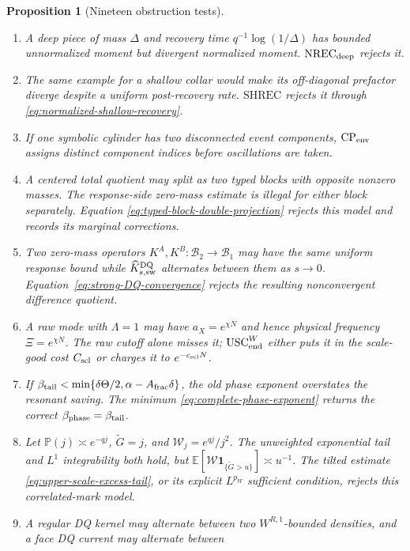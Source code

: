 \documentclass[11pt]{article}
\newtheorem{proposition}[theorem]{Proposition}
\newcommand{\cB}{\mathcal B}
\newcommand{\one}{\mathbf 1}
\begin{document}
\begin{proposition}[Nineteen obstruction tests]
\begin{enumerate}[label=\textup{(T\arabic*)}]
      the latter and never infers it from signed TV.
\item A deep piece of mass $\Delta$ and recovery time
      $q^{-1}\log(1/\Delta)$ has bounded unnormalized moment but divergent
      normalized moment.  $\mathrm{NREC}_{\rm deep}$ rejects it.
\item The same example for a shallow collar would make its off-diagonal
      prefactor diverge despite a uniform post-recovery rate.
      $\mathrm{SHREC}$ rejects it through
      \eqref{eq:normalized-shallow-recovery}.
\item If one symbolic cylinder has two disconnected event components,
      $\mathrm{CP}_{\rm env}$ assigns distinct component indices before
      oscillations are taken.
\item A centered total quotient may split as two typed blocks with opposite
      nonzero masses.  The response-side zero-mass estimate is illegal for
      either block separately.  Equation
      \eqref{eq:typed-block-double-projection} rejects this model and records
      its marginal corrections.
\item Two zero-mass operators $K^A,K^B:\cB_2\to\cB_1$ may have the same
      uniform response bound while
      $\widehat K_{s,\rm sw}^{\rm DQ}$ alternates between them as $s\to0$.
      Equation~\eqref{eq:strong-DQ-convergence} rejects the resulting
      nonconvergent difference quotient.
\item A raw mode with $\Lambda=1$ may have $a_X=e^{\chi N}$ and hence
      physical frequency $\Xi=e^{\chi N}$.  The raw cutoff alone misses it;
      $\mathrm{USC}_{\rm end}^{W}$ either puts it in the scale-good cost
      $C_{\rm scl}$ or charges it to $e^{-c_{\rm scl}N}$.
\item If $\beta_{\rm tail}<
      \min\{\delta\Theta/2,\alpha-A_{\rm frac}\delta\}$, the old phase
      exponent overstates the resonant saving.  The minimum
      \eqref{eq:complete-phase-exponent} returns the correct
      $\beta_{\rm phase}=\beta_{\rm tail}$.
\item Let $\mathbb P(j)\asymp e^{-qj}$,
      $\widetilde G=j$, and $\mathscr W_j=e^{qj}/j^2$.  The unweighted
      exponential tail and $L^1$ integrability both hold, but
      $\mathbb E[\mathscr W\one_{\{\widetilde G>u\}}]\asymp u^{-1}$.
      The tilted estimate \eqref{eq:upper-scale-excess-tail}, or its explicit
      $L^{p_W}$ sufficient condition, rejects this correlated-mark model.
\item A regular DQ kernel may alternate between two
      $W^{R,1}$-bounded densities, and a face DQ current may alternate between

\end{enumerate}
\end{proposition}
\end{document}

